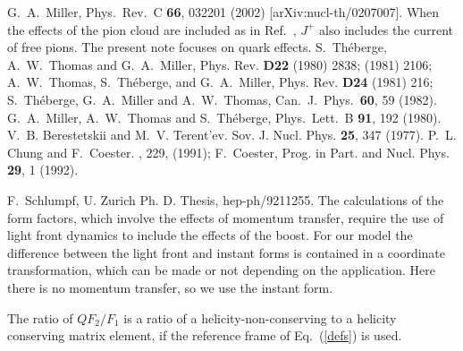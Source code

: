 \begin{thebibliography}{9}
G.~A.~Miller,
Phys.\ Rev.\ C {\bf 66}, 032201 (2002)
[arXiv:nucl-th/0207007].
 When the effects of the pion cloud \cite{cbm}
are included as in
Ref.~\cite{Miller:2002ig}, $J^+$ also includes the current of free pions.
The present note focuses on quark effects.
 S.\ Th\'eberge, A.\ W.\ Thomas and G.\ A.\ Miller,
Phys. Rev. {\bf D22} (1980) 2838;  (1981) 2106;
 A.\ W.\ Thomas,
S.\ Th\'eberge, and G.\ A.\ Miller, Phys. Rev. {\bf D24} (1981) 216; %
S.~Th\'eberge, G.~A.~Miller and A.~W.~Thomas,
Can.\ J.\ Phys.\  {\bf 60}, 59 (1982).
G.~A.~Miller, A.~W.~Thomas and S.~Th\'eberge,
Phys.\ Lett.\ B {\bf 91}, 192 (1980).
V.~B. Berestetskii and M.~V. Terent'ev.
\newblock Sov. J. Nucl. Phys. {\bf 25}, 347 (1977).
P.~L. Chung and F.~Coester.
,  229, (1991);
F.~Coester, Prog. in Part. and Nucl. Phys. {\bf 29}, 1 (1992).

F.~Schlumpf,
U. Zurich Ph. D. Thesis, hep-ph/9211255.
 The calculations of the form factors, which involve the
effects of momentum transfer,
require the use of light front dynamics to include the effects of
the boost. For our model the difference between the light front and
instant forms is contained in a coordinate transformation, which can be
made or not depending on the application.
 Here there is no momentum transfer, so we  use the instant form.

 The ratio of $QF_2/F_1$ is a ratio of a 
 helicity-non-conserving  to a helicity conserving matrix element, if the 
reference frame of Eq.~(\ref{defs}) is used.
\end{thebibliography}




